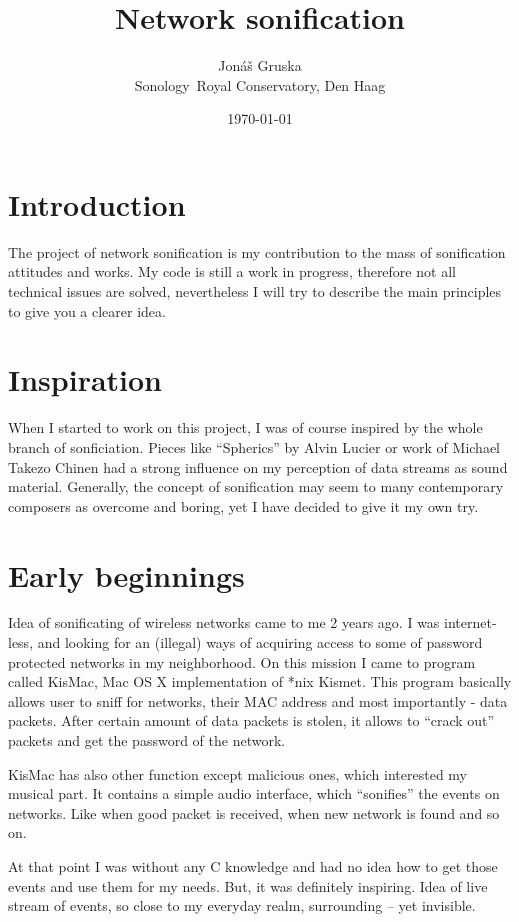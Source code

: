 \documentclass[11pt,a4paper,oneside]{article}
\title{Network sonification}
\author{Jonáš Gruska\\
	Sonology\
	Royal Conservatory, Den Haag}
\date{\today}
\begin{document}
\maketitle
\thispagestyle{empty}
\section{Introduction}
The project of network sonification is my contribution to the mass of sonification attitudes and works. My code is still a work in progress, therefore not all technical issues are solved, nevertheless I will try to describe the main principles to give you a clearer idea. 

\section{Inspiration}
When I started to work on this project, I was of course inspired by the whole branch of sonficiation. Pieces like ``Spherics'' by Alvin Lucier or work of Michael Takezo Chinen had a strong influence on my perception of data streams as sound material. Generally, the concept of sonification may seem to many contemporary composers as overcome and boring, yet I have decided to give it my own try.

\section{Early beginnings}
Idea of sonificating of wireless networks came to me 2 years ago. I was internet-less, and looking for an (illegal) ways of acquiring access to some of password protected networks in my neighborhood. On this mission I came to program called KisMac, Mac OS X implementation of *nix Kismet. This program basically allows user to sniff for networks, their MAC address and most importantly - data packets. After certain amount of data packets is stolen, it allows to ``crack out'' packets and get the password of the network.

KisMac has also other function except malicious ones, which interested my musical part. It contains a simple audio interface, which ``sonifies'' the events on networks. Like when good packet is received, when new network is found and so on.

At that point I was without any C knowledge and had no idea how to get those events and use them for my needs. But, it was definitely inspiring. Idea of live stream of events, so close to my everyday realm, surrounding -- yet invisible.
\end{document}
